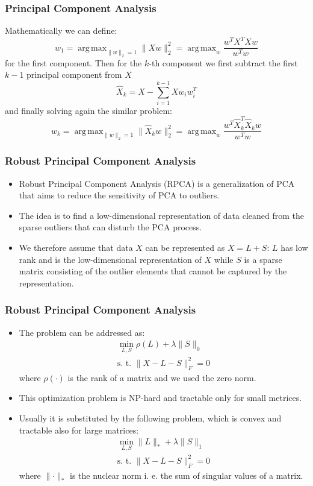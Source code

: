 \documentclass{beamer}
\theoremstyle{plain}
\theoremstyle{definition}
\theoremstyle{remark}
\newcommand{\norm}[1]{\lVert#1\rVert}
\DeclareMathOperator*{\argmax}{arg\,max}
\begin{document}
\begin{frame}
	\frametitle{Principal Component Analysis}
	Mathematically we can define:
		\begin{equation}
			w_1 = \argmax_{\norm{w}_{2}=1}{\norm{Xw}_{2}^2} = \argmax_{w}{\frac{w^TX^TXw}{w^Tw}}
		\end{equation}
		for the first component. Then for the $k$-th component we first subtract the first $k-1$ principal component from $X$
		\begin{equation}
			\hat{X}_{k} = X - \sum_{i=1}^{k-1}{Xw_{i}w_{i}^T}
		\end{equation}
		and finally solving again the similar problem:
		\begin{equation}
			w_k = \argmax_{\norm{w}_{2}=1}{\norm{\hat{X}_{k}w}_{2}^2} = \argmax_{w}{\frac{w^T\hat{X}_{k}^T\hat{X}_{k}w}{w^Tw}}
		\end{equation}
\end{frame}

\begin{frame}
	\frametitle{Robust Principal Component Analysis}
	\begin{itemize}
		\item Robust Principal Component Analysis (RPCA) is a generalization of PCA that aims to reduce the sensitivity of PCA to outliers.
		\item The idea is to find a low-dimensional representation of data cleaned from the sparse outliers that can disturb the PCA process.
		\item We therefore assume that data $X$ can be represented as $X = L + S$: $L$ has low rank and is the low-dimensional representation of $X$ while $S$ is a sparse matrix 
			consisting of the outlier elements that cannot be captured by the representation.
	\end{itemize}
\end{frame}

\begin{frame}
	\frametitle{Robust Principal Component Analysis}
	\begin{itemize}
		\item The problem can be addressed as:
			\begin{align}
				\min_{L,S}{\rho(L)+\lambda \norm{S}_{0}}\\
				\text{s. t. }\norm{X - L - S}_{F}^2=0 
			\end{align}
			where $\rho(\cdot)$ is the rank of a matrix and we used the zero norm.
		\item This optimization problem is NP-hard and tractable only for small metrices.
		\item Usually it is substituted by the following problem, which is convex and tractable also for large matrices:
			\begin{align}
				\min_{L,S}{\norm{L}_{*}+\lambda \norm{S}_{1}}\\
				\text{s. t. }\norm{X - L - S}_F^2=0
			\end{align}
			where $\norm{\cdot}_*$ is the nuclear norm i. e. the sum of singular values of a matrix.
	\end{itemize}
\end{frame}
\end{document}
